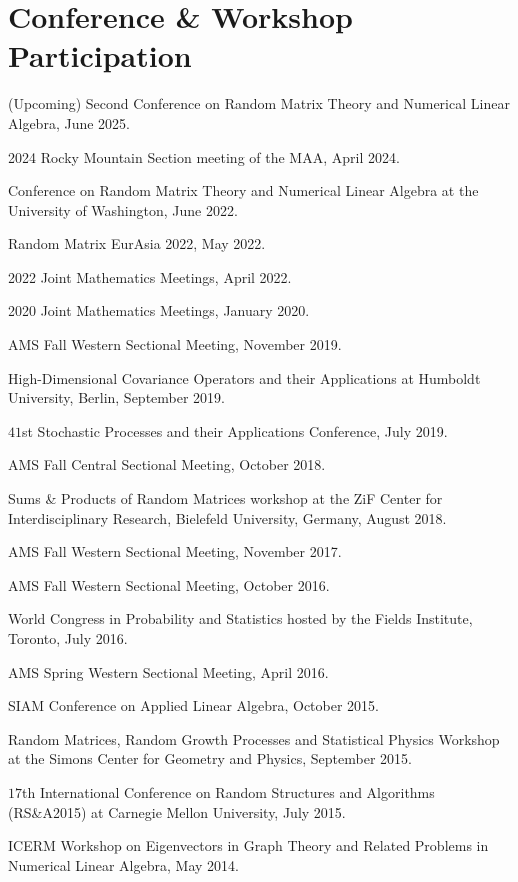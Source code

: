 \documentclass[letterpaper]{article}
\renewenvironment{itemize}{
  \begin{list}{}{
    \setlength{\leftmargin}{1em}
  }
}{
  \end{list}
}
\begin{document}
\section*{Conference \& Workshop Participation}
\begin{itemize}
	\item (Upcoming) Second Conference on Random Matrix Theory and Numerical Linear Algebra, June 2025. 
	\item 2024 Rocky Mountain Section meeting of the MAA, April 2024. 
	\item Conference on Random Matrix Theory and Numerical Linear Algebra at the University of Washington, June 2022.  
	\item Random Matrix EurAsia 2022, May 2022.
	\item 2022 Joint Mathematics Meetings, April 2022.
	\item 2020 Joint Mathematics Meetings, January 2020.  
	\item AMS Fall Western Sectional Meeting, November 2019.  
	\item High-Dimensional Covariance Operators and their Applications at Humboldt University, Berlin, September 2019.  
	\item $41$st Stochastic Processes and their Applications Conference, July 2019.
	\item AMS Fall Central Sectional Meeting, October 2018.  
	\item Sums \& Products of Random Matrices workshop at the ZiF Center for Interdisciplinary Research, Bielefeld University, Germany, August 2018.
	\item AMS Fall Western Sectional Meeting, November 2017.  
	\item AMS Fall Western Sectional Meeting, October 2016.  
	\item World Congress in Probability and Statistics hosted by the Fields Institute, Toronto, July 2016.  
	\item AMS Spring Western Sectional Meeting, April 2016.  
	\item SIAM Conference on Applied Linear Algebra, October 2015.
	\item Random Matrices, Random Growth Processes and Statistical Physics Workshop at the Simons Center for Geometry and Physics, September 2015.
	\item $17$th International Conference on Random Structures and Algorithms (RS\&A2015) at Carnegie Mellon University, July 2015.
	\item ICERM Workshop on Eigenvectors in Graph Theory and Related Problems in Numerical Linear Algebra, May 2014.

\end{itemize}
\end{document}
